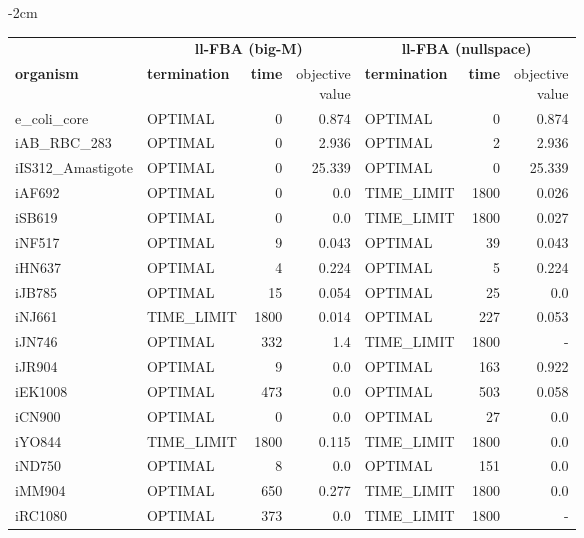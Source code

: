 \begin{table}[!ht]
    \small
    \centering
    \addtolength{\leftskip} {-2cm}
    \addtolength{\rightskip}{-2cm}
    \begin{tabular}{@{\extracolsep{4pt}}llrrlrr@{}}
    \hline
        \multicolumn{1}{c}{} & \multicolumn{3}{c}{\textbf{ll-FBA (big-M)}} & \multicolumn{3}{c}{\textbf{ll-FBA (nullspace)}}\\ \cline{2-4} \cline{5-7} 
        \textbf{organism} & \textbf{termination} & \textbf{time} & \thead{objective \\value} & \textbf{termination} & \textbf{time} & \thead{objective \\value} \\ \hline
        e\_coli\_core & OPTIMAL & 0 & 0.874 & OPTIMAL & 0 & 0.874 \\
        iAB\_RBC\_283 & OPTIMAL & 0 & 2.936 & OPTIMAL & 2 & 2.936 \\
        iIS312\_Amastigote & OPTIMAL & 0 & 25.339 & OPTIMAL & 0 & 25.339 \\
        iAF692 & OPTIMAL & 0 & 0.0 & TIME\_LIMIT & 1800 & 0.026 \\
        iSB619 & OPTIMAL & 0 & 0.0 & TIME\_LIMIT & 1800 & 0.027 \\
        iNF517 & OPTIMAL & 9 & 0.043 & OPTIMAL & 39 & 0.043 \\
        iHN637 & OPTIMAL & 4 & 0.224 & OPTIMAL & 5 & 0.224 \\
        iJB785 & OPTIMAL & 15 & 0.054 & OPTIMAL & 25 & 0.0 \\
        iNJ661 & TIME\_LIMIT & 1800 & 0.014 & OPTIMAL & 227 & 0.053 \\ 
        iJN746 & OPTIMAL & 332 & 1.4 & TIME\_LIMIT & 1800 & - \\
        iJR904 & OPTIMAL & 9 & 0.0 & OPTIMAL & 163 & 0.922 \\
        iEK1008 & OPTIMAL & 473 & 0.0 & OPTIMAL & 503 & 0.058 \\
        iCN900 & OPTIMAL & 0 & 0.0 & OPTIMAL & 27 & 0.0 \\
        iYO844 & TIME\_LIMIT & 1800 & 0.115 & TIME\_LIMIT & 1800 & 0.0 \\
        iND750 & OPTIMAL & 8 & 0.0 & OPTIMAL & 151 & 0.0 \\
        iMM904 & OPTIMAL & 650 & 0.277 & TIME\_LIMIT & 1800 & 0.0 \\
        iRC1080 & OPTIMAL & 373 & 0.0 & TIME\_LIMIT & 1800 & - \\

\end{tabular}
\end{table}
